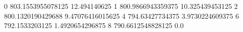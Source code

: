 0 803.1553955078125 12.494140625
1 800.9866943359375 10.325439453125
2 800.1320190429688 9.47076416015625
4 794.63427734375 3.9730224609375
6 792.1533203125 1.4920654296875
8 790.6612548828125 0.0
